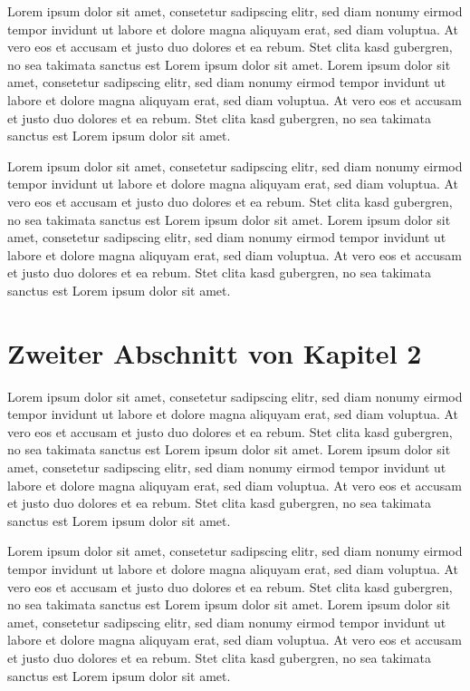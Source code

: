 Lorem ipsum dolor sit amet, consetetur sadipscing elitr, sed diam nonumy eirmod tempor invidunt ut labore et dolore magna aliquyam erat, sed diam voluptua. At vero eos et accusam et justo duo dolores et ea rebum. Stet clita kasd gubergren, no sea takimata sanctus est Lorem ipsum dolor sit amet. Lorem ipsum dolor sit amet, consetetur sadipscing elitr, sed diam nonumy eirmod tempor invidunt ut labore et dolore magna aliquyam erat, sed diam voluptua. At vero eos et accusam et justo duo dolores et ea rebum. Stet clita kasd gubergren, no sea takimata sanctus est Lorem ipsum dolor sit amet.

Lorem ipsum dolor sit amet, consetetur sadipscing elitr, sed diam nonumy eirmod tempor invidunt ut labore et dolore magna aliquyam erat, sed diam voluptua. At vero eos et accusam et justo duo dolores et ea rebum. Stet clita kasd gubergren, no sea takimata sanctus est Lorem ipsum dolor sit amet. Lorem ipsum dolor sit amet, consetetur sadipscing elitr, sed diam nonumy eirmod tempor invidunt ut labore et dolore magna aliquyam erat, sed diam voluptua. At vero eos et accusam et justo duo dolores et ea rebum. Stet clita kasd gubergren, no sea takimata sanctus est Lorem ipsum dolor sit amet.
\section{Zweiter Abschnitt von Kapitel 2}
Lorem ipsum dolor sit amet, consetetur sadipscing elitr, sed diam nonumy eirmod tempor invidunt ut labore et dolore magna aliquyam erat, sed diam voluptua. At vero eos et accusam et justo duo dolores et ea rebum. Stet clita kasd gubergren, no sea takimata sanctus est Lorem ipsum dolor sit amet. Lorem ipsum dolor sit amet, consetetur sadipscing elitr, sed diam nonumy eirmod tempor invidunt ut labore et dolore magna aliquyam erat, sed diam voluptua. At vero eos et accusam et justo duo dolores et ea rebum. Stet clita kasd gubergren, no sea takimata sanctus est Lorem ipsum dolor sit amet.

Lorem ipsum dolor sit amet, consetetur sadipscing elitr, sed diam nonumy eirmod tempor invidunt ut labore et dolore magna aliquyam erat, sed diam voluptua. At vero eos et accusam et justo duo dolores et ea rebum. Stet clita kasd gubergren, no sea takimata sanctus est Lorem ipsum dolor sit amet. Lorem ipsum dolor sit amet, consetetur sadipscing elitr, sed diam nonumy eirmod tempor invidunt ut labore et dolore magna aliquyam erat, sed diam voluptua. At vero eos et accusam et justo duo dolores et ea rebum. Stet clita kasd gubergren, no sea takimata sanctus est Lorem ipsum dolor sit amet.

